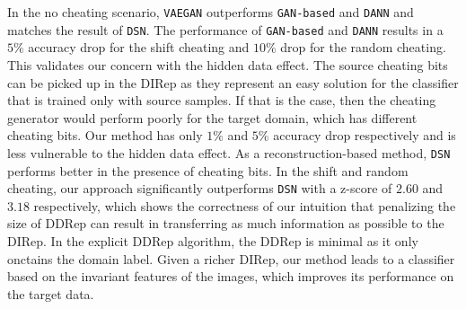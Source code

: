 \documentclass{article}
\begin{document}
In the no cheating scenario, \verb"VAEGAN" outperforms  \verb"GAN-based" and \verb"DANN" and matches the result of \verb"DSN". %
The performance of \verb"GAN-based" and \verb"DANN" results in a $5\%$ accuracy drop for the shift cheating and $10\%$ drop for the random cheating. This validates our concern with the hidden data effect. The source cheating bits can be picked up in the DIRep as they represent an easy solution for the classifier that is trained only with source samples. If that is the case, then the cheating generator would perform poorly for the target domain, which has different cheating bits. Our method has only $1\%$ and $5\%$ accuracy drop respectively and is less vulnerable to the hidden data effect. As a reconstruction-based method, \verb"DSN" performs better in the presence of cheating bits. In the shift and random cheating, our approach significantly outperforms \verb"DSN" with a z-score of $2.60$ and $3.18$ respectively, which shows the correctness of our intuition that penalizing the size of DDRep can result in transferring as much information as possible to the DIRep. In the explicit DDRep algorithm, the DDRep is minimal as it only onctains the domain label. Given  a richer DIRep, our method leads to a classifier based on the invariant features of the images, which improves its performance on the target data.
\end{document}
